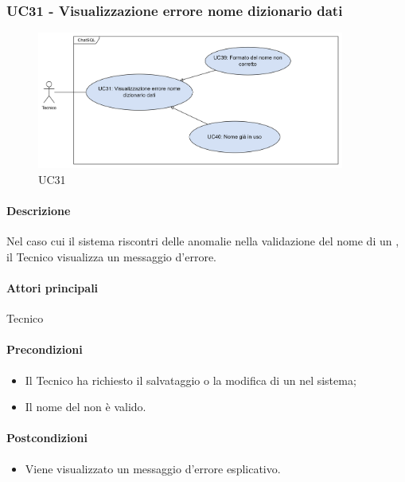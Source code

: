 \subsubsection{UC31 - Visualizzazione errore nome dizionario dati}\label{UC31}

\begin{figure}[H]
  \centering
  \includegraphics[width=0.90\textwidth]{assets/uc31.png}
  \caption{UC31}
\end{figure}

\paragraph*{Descrizione}
Nel caso cui il sistema riscontri delle anomalie nella validazione del nome di un , il Tecnico visualizza un messaggio d'errore.

\paragraph*{Attori principali}
Tecnico

\paragraph*{Precondizioni}
\begin{itemize}
  \item Il Tecnico ha richiesto il salvataggio o la modifica di un  nel sistema;
  \item Il nome del  non è valido.
\end{itemize}

\paragraph*{Postcondizioni}
\begin{itemize}
  \item Viene visualizzato un messaggio d'errore esplicativo.
\end{itemize}

